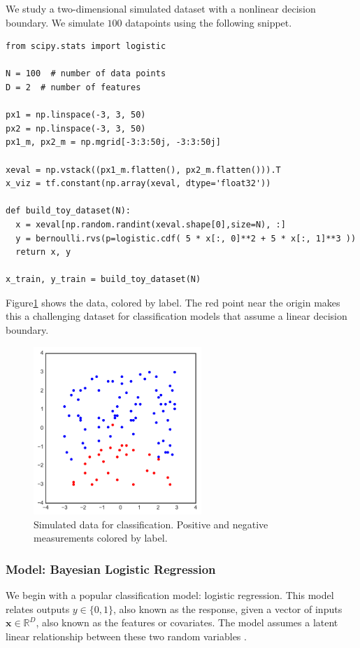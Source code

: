 We study a two-dimensional simulated dataset with a nonlinear decision
boundary. We simulate $100$ datapoints using the following snippet.
\begin{lstlisting}
from scipy.stats import logistic

N = 100  # number of data points
D = 2  # number of features

px1 = np.linspace(-3, 3, 50)
px2 = np.linspace(-3, 3, 50)
px1_m, px2_m = np.mgrid[-3:3:50j, -3:3:50j]

xeval = np.vstack((px1_m.flatten(), px2_m.flatten())).T
x_viz = tf.constant(np.array(xeval, dtype='float32'))

def build_toy_dataset(N):
  x = xeval[np.random.randint(xeval.shape[0],size=N), :]
  y = bernoulli.rvs(p=logistic.cdf( 5 * x[:, 0]**2 + 5 * x[:, 1]**3 ))
  return x, y

x_train, y_train = build_toy_dataset(N)
\end{lstlisting}

Figure\nobreakspace \ref{fig:lr_data} shows the data, colored by label. The red point near the
origin makes this a challenging dataset for classification models that assume a
linear decision boundary.
\begin{figure}[!htbp]
\centering
\includegraphics[width=2.5in]{images/lr_data.pdf}
\caption{Simulated data for classification. Positive and negative measurements
colored by label.}
\label{fig:lr_data}
\end{figure}


\subsubsection{Model: Bayesian Logistic Regression}

We begin with a popular classification model: logistic regression. This model
relates outputs $y\in\{0,1\}$, also known as the response, given
a vector of inputs $\mathbf{x}\in\mathbb{R}^D$, also known as the features or
covariates. The model assumes a latent linear relationship between these two random
variables \citep{gelman2013bayesian}.


